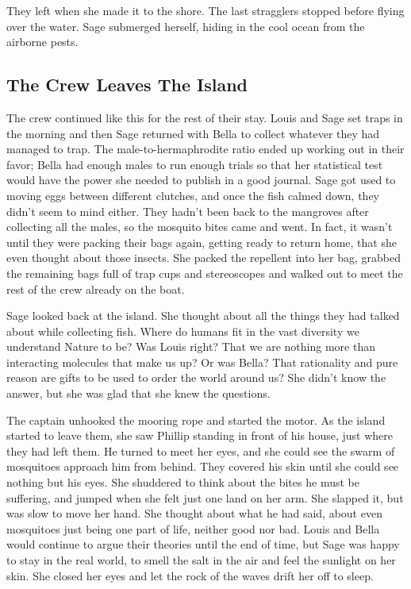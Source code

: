 \documentclass[12pt, fleqn, AofM.tex]{subfiles}
\begin{document}
They left when she made it to the shore. The last stragglers stopped before flying over the water. Sage submerged herself, hiding in the cool ocean from the airborne pests.


\subsection{The Crew Leaves The Island}
The crew continued like this for the rest of their stay. Louis and Sage set traps in the morning and then Sage returned with Bella to collect whatever they had managed to trap. The male-to-hermaphrodite ratio ended up working out in their favor; Bella had enough males to run enough trials so that her statistical test would have the power she needed to publish in a good journal. Sage got used to moving eggs between different clutches, and once the fish calmed down, they didn't seem to mind either. They hadn't been back to the mangroves after collecting all the males, so the mosquito bites came and went. In fact, it wasn't until they were packing their bags again, getting ready to return home, that she even thought about those insects. She packed the repellent into her bag, grabbed the remaining bags full of trap cups and stereoscopes and walked out to meet the rest of the crew already on the boat. 

Sage looked back at the island. She thought about all the things they had talked about while collecting fish. Where do humans fit in the vast diversity we understand Nature to be? Was Louis right? That we are nothing more than interacting molecules that make us up? Or was Bella? That rationality and pure reason are gifts to be used to order the world around us? She didn't know the answer, but she was glad that she knew the questions.

The captain unhooked the mooring rope and started the motor. As the island started to leave them, she saw Phillip standing in front of his house, just where they had left them. He turned to meet her eyes, and she could see the swarm of mosquitoes approach him from behind. They covered his skin until she could see nothing but his eyes. She shuddered to think about the bites he must be suffering, and jumped when she felt just one land on her arm. She slapped it, but was slow to move her hand. She thought about what he had said, about even mosquitoes just being one part of life, neither good nor bad. Louis and Bella would continue to argue their theories until the end of time, but Sage was happy to stay in the real world, to smell the salt in the air and feel the sunlight on her skin. She closed her eyes and let the rock of the waves drift her off to sleep. 
\end{document}
